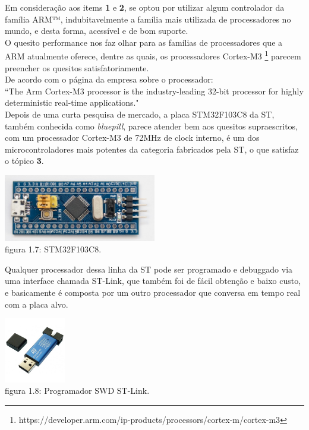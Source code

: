 \documentclass[11pt,a4paper]{report}
\begin{document}
	Em consideração aos items {\bf 1} e {\bf 2}, se optou por utilizar algum controlador da família ARM™, indubitavelmente a família mais utilizada de processadores no mundo, e desta forma, acessível e de bom suporte. \\
	
	O quesito performance nos faz olhar para as famílias de processadores que a ARM atualmente oferece, dentre as quais, os processadores Cortex-M3 \footnote{https://developer.arm.com/ip-products/processors/cortex-m/cortex-m3} parecem preencher os quesitos satisfatoriamente. \\
	
	De acordo com o página da empresa sobre o processador:\\
	
	``The Arm Cortex-M3 processor is the industry-leading 32-bit processor for highly deterministic real-time applications."\\
	
	Depois de uma curta pesquisa de mercado, a placa STM32F103C8 da ST, também conhecida como {\it bluepill}, parece atender bem aos quesitos supraescritos, com um processador Cortex-M3 de 72MHz de clock interno, é um dos microcontroladores mais potentes da categoria fabricados pela ST, o que satisfaz o tópico {\bf 3}.\\
	\begin{center}
		\includegraphics[width=0.5\textwidth]{bluepill}\\
		\footnotesize{figura 1.7: STM32F103C8.}
	\end{center}

	
	Qualquer processador dessa linha da ST pode ser programado e debuggado via uma interface chamada ST-Link, que também foi de fácil obtenção e baixo custo, e basicamente é composta por um outro processador que conversa em tempo real com a placa alvo.
	\begin{center}
	\includegraphics[width=0.2\textwidth]{stlink}\\
	\footnotesize{figura 1.8: Programador SWD ST-Link.}
	\end{center}
	
\end{document}
